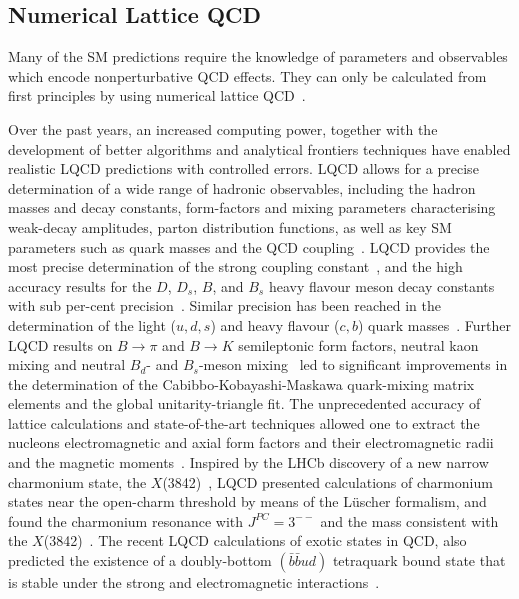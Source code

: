 \subsection{ Numerical Lattice  QCD}


Many of the SM  predictions require the knowledge  of  parameters and observables  which encode nonperturbative QCD effects.  They can only be calculated from first principles  by using numerical lattice QCD~\cite{Aoki,Bazavov:2019lgz,Cirigliano:2019jig}.

Over the past years, an increased computing power, together with   the development of better algorithms and  analytical frontiers  techniques have enabled realistic LQCD predictions   with controlled errors. LQCD allows for a  precise  determination of a wide range of hadronic observables, including the hadron masses and  decay constants, form-factors and mixing parameters characterising weak-decay amplitudes,  parton distribution functions, as well as key SM parameters such as quark masses and the QCD coupling~\cite{Aoki}.
LQCD    provides   the most precise determination of the strong coupling constant~\cite{Patrignani:2016xqp,Aoki:2016frl},  and the high accuracy    results for  the  $D$, $D_s$, $B$, and $B_s$ heavy flavour meson decay constants  with sub per-cent precision~\cite{Bazavov:2017lyh}. Similar precision  has been reached in the determination of the  light ($u,d,s$) and heavy flavour ($c,b$) quark  masses~\cite{Bazavov:2018omf}.
 Further  LQCD results on  $B\to \pi$ and  $B\to K$ semileptonic form factors, neutral kaon mixing  and neutral $B_d$- and $B_s$-meson  mixing~\cite{Dowdall:2019bea}  led to significant improvements in the determination of the Cabibbo-Kobayashi-Maskawa   quark-mixing matrix elements and the global unitarity-triangle fit.
The  unprecedented  accuracy  of  lattice calculations  and  state-of-the-art  techniques    allowed one to extract the nucleons  electromagnetic and axial  form  factors and their electromagnetic radii and the magnetic  moments~\cite{Alexandrou:2018sjm,Alexandrou:2018lvq,Djukanovic:2019jtp}.
Inspired by the LHCb discovery of  a  new  narrow  charmonium  state,  the $X$(3842)~\cite{Aaij:2019evc}, LQCD presented  calculations   of   charmonium states  near the open-charm threshold by   means of  the  L\"uscher  formalism, and found  the charmonium resonance with $J^{PC}=3^{--}$ and the mass consistent with the $X$(3842)~\cite{Aaij:2019evc}.  The  recent  LQCD  calculations  of exotic states in  QCD,  also predicted    the existence of a  doubly-bottom $(\bar b\bar b ud)$ tetraquark bound state that is stable under the strong and electromagnetic interactions~\cite{Piemonte:2019cbi}.



